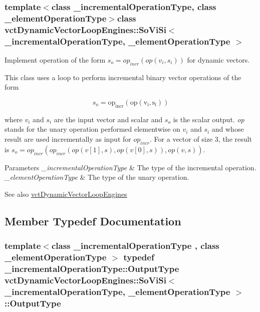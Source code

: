 \subsubsection*{template$<$class \+\_\+incremental\+Operation\+Type, class \+\_\+element\+Operation\+Type$>$class vct\+Dynamic\+Vector\+Loop\+Engines\+::\+So\+Vi\+Si$<$ \+\_\+incremental\+Operation\+Type, \+\_\+element\+Operation\+Type $>$}

Implement operation of the form $s_o = op_{incr}(op(v_i, s_i))$ for dynamic vectors. 

This class uses a loop to perform incremental binary vector operations of the form

\[ s_o = \mathrm{op_{incr}(\mathrm{op}(v_i, s_i))} \]

where $v_i$ and $s_i$ are the input vector and scalar and $s_o$ is the scalar output. {\itshape op} stands for the unary operation performed elementwise on $v_i$ and $s_i$ and whose result are used incrementally as input for $op_{incr}$. For a vector of size 3, the result is $s_o = op_{incr}(op_{incr}(op(v[1], s), op(v[0], s)), op(v, s))$.


\begin{DoxyParams}{Parameters}
{\em \+\_\+incremental\+Operation\+Type} & The type of the incremental operation.\\
\hline
{\em \+\_\+element\+Operation\+Type} & The type of the unary operation.\\
\hline
\end{DoxyParams}
\begin{DoxySeeAlso}{See also}
\hyperlink{classvct_dynamic_vector_loop_engines}{vct\+Dynamic\+Vector\+Loop\+Engines} 
\end{DoxySeeAlso}


\subsection{Member Typedef Documentation}
\hypertarget{classvct_dynamic_vector_loop_engines_1_1_so_vi_si_a331ca8ec7bde5a60281e490a5d8c396a}{}
\subsubsection[{Output\+Type}]{\setlength{\rightskip}{0pt plus 5cm}template$<$class \+\_\+incremental\+Operation\+Type , class \+\_\+element\+Operation\+Type $>$ typedef \+\_\+incremental\+Operation\+Type\+::\+Output\+Type {\bf vct\+Dynamic\+Vector\+Loop\+Engines\+::\+So\+Vi\+Si}$<$ \+\_\+incremental\+Operation\+Type, \+\_\+element\+Operation\+Type $>$\+::{\bf Output\+Type}}\label{classvct_dynamic_vector_loop_engines_1_1_so_vi_si_a331ca8ec7bde5a60281e490a5d8c396a}


